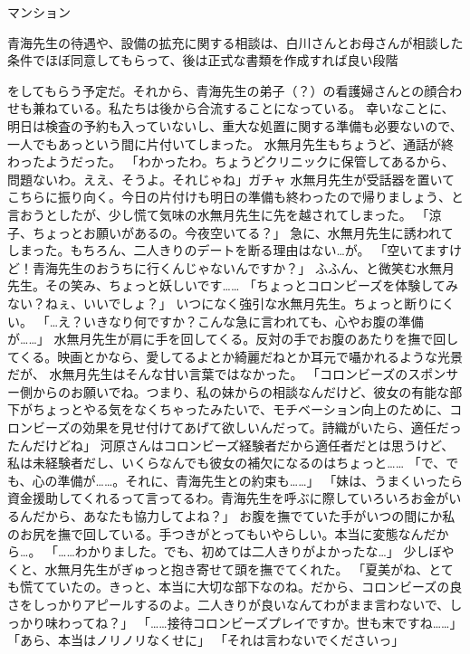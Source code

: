 マンション

青海先生の待遇や、設備の拡充に関する相談は、白川さんとお母さんが相談した条件でほぼ同意してもらって、後は正式な書類を作成すれば良い段階


をしてもらう予定だ。それから、青海先生の弟子（？）の看護婦さんとの顔合わせも兼ねている。私たちは後から合流することになっている。
幸いなことに、明日は検査の予約も入っていないし、重大な処置に関する準備も必要ないので、一人でもあっという間に片付いてしまった。
水無月先生もちょうど、通話が終わったようだった。
「わかったわ。ちょうどクリニックに保管してあるから、問題ないわ。ええ、そうよ。それじゃね」ガチャ
水無月先生が受話器を置いてこちらに振り向く。今日の片付けも明日の準備も終わったので帰りましょう、と言おうとしたが、少し慌て気味の水無月先生に先を越されてしまった。
「涼子、ちょっとお願いがあるの。今夜空いてる？」
急に、水無月先生に誘われてしまった。もちろん、二人きりのデートを断る理由はない…が。
「空いてますけど！青海先生のおうちに行くんじゃないんですか？」
ふふん、と微笑む水無月先生。その笑み、ちょっと妖しいです……
「ちょっとコロンビーズを体験してみない？ねぇ、いいでしょ？」
いつになく強引な水無月先生。ちょっと断りにくい。
「…え？いきなり何ですか？こんな急に言われても、心やお腹の準備が……」
水無月先生が肩に手を回してくる。反対の手でお腹のあたりを撫で回してくる。映画とかなら、愛してるよとか綺麗だねとか耳元で囁かれるような光景だが、
水無月先生はそんな甘い言葉ではなかった。
「コロンビーズのスポンサー側からのお願いでね。つまり、私の妹からの相談なんだけど、彼女の有能な部下がちょっとやる気をなくちゃったみたいで、モチベーション向上のために、コロンビーズの効果を見せ付けてあげて欲しいんだって。詩織がいたら、適任だったんだけどね」
河原さんはコロンビーズ経験者だから適任者だとは思うけど、私は未経験者だし、いくらなんでも彼女の補欠になるのはちょっと……
「で、でも、心の準備が……。それに、青海先生との約束も……」
「妹は、うまくいったら資金援助してくれるって言ってるわ。青海先生を呼ぶに際していろいろお金がいるんだから、あなたも協力してよね？」
お腹を撫でていた手がいつの間にか私のお尻を撫で回している。手つきがとってもいやらしい。本当に変態なんだから…。
「……わかりました。でも、初めては二人きりがよかったな…」
少しぼやくと、水無月先生がぎゅっと抱き寄せて頭を撫でてくれた。
「夏美がね、とても慌てていたの。きっと、本当に大切な部下なのね。だから、コロンビーズの良さをしっかりアピールするのよ。二人きりが良いなんてわがまま言わないで、しっかり味わってね？」
「……接待コロンビーズプレイですか。世も末ですね……」
「あら、本当はノリノリなくせに」
「それは言わないでくださいっ」

